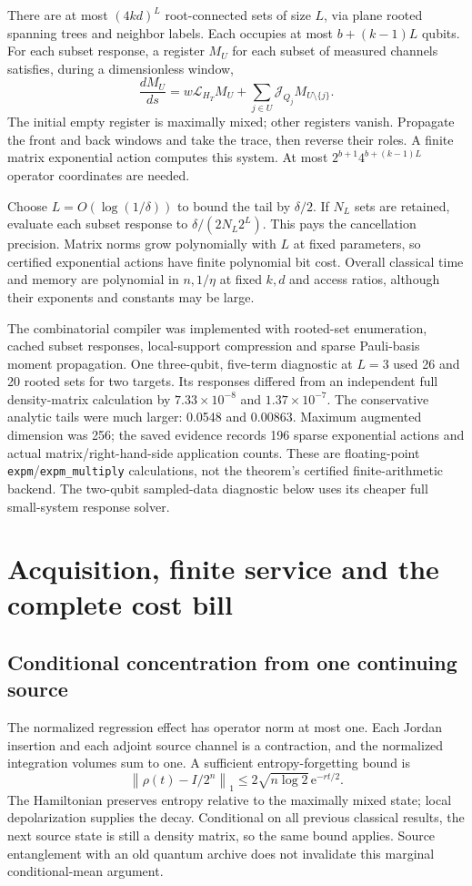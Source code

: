 \documentclass[11pt]{article}
\newcommand{\ee}{\mathrm e}
\newcommand{\norm}[1]{\left\lVert #1\right\rVert}
\newcommand{\cL}{\mathcal L}
\newcommand{\cJ}{\mathcal J}
\begin{document}
There are at most \((4kd)^L\) root-connected sets of size \(L\), via plane rooted spanning trees and neighbor labels. Each occupies at most \(b+(k-1)L\) qubits. For each subset response, a register \(M_U\) for each subset of measured channels satisfies, during a dimensionless window,
\[
 \frac{dM_U}{ds}=w\cL_{H_T}M_U+
 \sum_{j\in U}\cJ_{Q_j}M_{U\setminus\{j\}}.
\]
The initial empty register is maximally mixed; other registers vanish. Propagate the front and back windows and take the trace, then reverse their roles. A finite matrix exponential action computes this system. At most \(2^{b+1}4^{b+(k-1)L}\) operator coordinates are needed.

Choose \(L=O(\log(1/\delta))\) to bound the tail by \(\delta/2\). If \(N_L\) sets are retained, evaluate each subset response to \(\delta/(2N_L2^L)\). This pays the cancellation precision. Matrix norms grow polynomially with \(L\) at fixed parameters, so certified exponential actions have finite polynomial bit cost. Overall classical time and memory are polynomial in \(n,1/\eta\) at fixed \(k,d\) and access ratios, although their exponents and constants may be large.

The combinatorial compiler was implemented with rooted-set enumeration, cached subset responses, local-support compression and sparse Pauli-basis moment propagation. One three-qubit, five-term diagnostic at \(L=3\) used 26 and 20 rooted sets for two targets. Its responses differed from an independent full density-matrix calculation by \(7.33\times10^{-8}\) and \(1.37\times10^{-7}\). The conservative analytic tails were much larger: 0.0548 and 0.00863. Maximum augmented dimension was 256; the saved evidence records 196 sparse exponential actions and actual matrix/right-hand-side application counts. These are floating-point \texttt{expm}/\texttt{expm\_multiply} calculations, not the theorem's certified finite-arithmetic backend. The two-qubit sampled-data diagnostic below uses its cheaper full small-system response solver.

\section{Acquisition, finite service and the complete cost bill}
\subsection{Conditional concentration from one continuing source}
The normalized regression effect has operator norm at most one. Each Jordan insertion and each adjoint source channel is a contraction, and the normalized integration volumes sum to one. A sufficient entropy-forgetting bound is
\[
 \norm{\rho(t)-I/2^n}_1
 \le2\sqrt{n\log2}\,\ee^{-rt/2}.
\]
The Hamiltonian preserves entropy relative to the maximally mixed state; local depolarization supplies the decay. Conditional on all previous classical results, the next source state is still a density matrix, so the same bound applies. Source entanglement with an old quantum archive does not invalidate this marginal conditional-mean argument.
\end{document}
